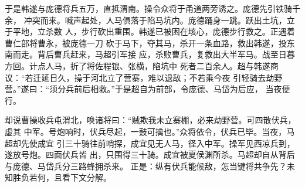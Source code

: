 于是韩遂与庞德将兵五万，直抵渭南。操令众将于甬道两旁诱之。庞德先引铁骑千余，
冲突而来。喊声起处，人马俱落于陷马坑内。庞德踊身一跳。跃出土坑，立于平地，立杀数
人，步行砍出重围。韩遂已被困在垓心，庞德步行救之。正遇着曹仁部将曹永，被庞德一刀
砍于马下，夺其马，杀开一条血路，救出韩遂，投东南而走。背后曹兵赶来，马超引军接
应，杀败曹兵，复救出大半军马。战至日暮方回。计点人马，折了将佐程银、张横，陷坑中
死者二百余人。超与韩遂商议：“若迁延日久，操于河北立了营寨，难以退敌；不若乘今夜
引轻骑去劫野营。”遂曰：“须分兵前后相救。”于是超自为前部，令庞德、马岱为后应，
当夜便行。

却说曹操收兵屯渭北，唤诸将曰：“贼欺我未立寨棚，必来劫野营。可四散伏兵，虚其
中军。号炮响时，伏兵尽起，一鼓可擒也。”众将依令，伏兵已毕。当夜，马超却先使成宜
引三十骑往前哨探，成宜见无人马，径入中军。操军见西凉兵到，遂放号炮。四面伏兵皆
出，只围得三十骑。成宜被夏侯渊所杀。马超却自从背后与庞德、马岱兵分三路蜂拥杀来。
正是：纵有伏兵能候敌，怎当键将共争先？未知胜负若何，且看下文分解。